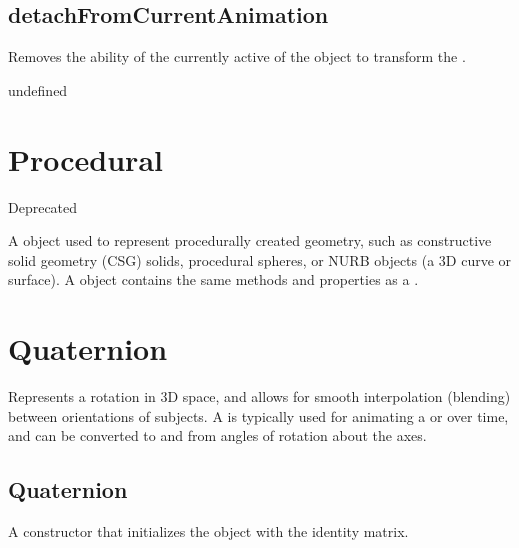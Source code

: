 \documentclass[letterpaper,12pt,english,openany,oneside]{sphinxmanual}
\begin{document}
\label{\detokenize{JS_3D_API:properties-20}}


\subsection{detachFromCurrentAnimation}
\label{\detokenize{JS_3D_API:detachfromcurrentanimation}}
Removes the ability of the currently active  of the  object to transform the .

\label{\detokenize{JS_3D_API:syntax-71}}

\begin{sphinxVerbatim}[commandchars=\\\{\}]
\end{sphinxVerbatim}
\label{\detokenize{JS_3D_API:returns-72}}

undefined


\section{Procedural}
\label{\detokenize{JS_3D_API:procedural}}
Deprecated

A  object used to represent procedurally created geometry, such as constructive solid geometry (CSG) solids, procedural spheres, or NURB objects (a 3D curve or surface). A  object contains the same methods and properties as a .


\section{Quaternion}
\label{\detokenize{JS_3D_API:quaternion}}
Represents a rotation in 3D space, and allows for smooth interpolation (blending) between orientations of subjects. A  is typically used for animating a  or  over time, and can be converted to and from angles of rotation about the axes.


\subsection{Quaternion}
\label{\detokenize{JS_3D_API:quaternion-1}}\label{\detokenize{JS_3D_API:id21}}
A constructor that initializes the object with the identity matrix.
\end{document}
